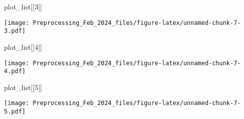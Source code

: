 \documentclass[
]{article}
\newenvironment{Shaded}{\begin{snugshade}}{\end{snugshade}}
\newcommand{\DecValTok}[1]{\textcolor[rgb]{0.00,0.00,0.81}{#1}}
\newcommand{\NormalTok}[1]{#1}
\begin{document}
\begin{Shaded}
\begin{Highlighting}[]
\NormalTok{plot\_list[[}\DecValTok{3}\NormalTok{]]}
\end{Highlighting}
\end{Shaded}

\texttt{[image: Preprocessing\_Feb\_2024\_files/figure-latex/unnamed-chunk-7-3.pdf]}

\begin{Shaded}
\begin{Highlighting}[]
\NormalTok{plot\_list[[}\DecValTok{4}\NormalTok{]]}
\end{Highlighting}
\end{Shaded}

\texttt{[image: Preprocessing\_Feb\_2024\_files/figure-latex/unnamed-chunk-7-4.pdf]}

\begin{Shaded}
\begin{Highlighting}[]
\NormalTok{plot\_list[[}\DecValTok{5}\NormalTok{]]}
\end{Highlighting}
\end{Shaded}

\texttt{[image: Preprocessing\_Feb\_2024\_files/figure-latex/unnamed-chunk-7-5.pdf]}
\end{document}
